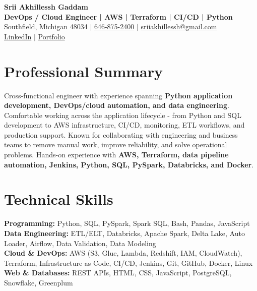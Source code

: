 \documentclass[letterpaper,10pt]{article}
\begin{document}
\fontsize{9.35pt}{10.45pt}\selectfont

\begin{center}
    {\LARGE \textbf{Srii Akhillessh Gaddam}} \\[-1pt]
    \textbf{DevOps / Cloud Engineer | AWS | Terraform | CI/CD | Python} \\[2pt]
    Southfield, Michigan 48034 $|$
    \href{tel:6468752400}{646-875-2400} $|$
    \href{mailto:sriiakhillessh@gmail.com}{sriiakhillessh@gmail.com} \\[1pt]
    \href{https://www.linkedin.com/in/srii-akhiilessh-gaddam-b48668191/}{LinkedIn} $|$
    \href{https://sriiakhillesshg.github.io/portfolio/}{Portfolio}
\end{center}
\vspace{-8pt}

\section{Professional Summary}
\small{Cross-functional engineer with experience spanning \textbf{Python application development, DevOps/cloud automation, and data engineering}. Comfortable working across the application lifecycle - from Python and SQL development to AWS infrastructure, CI/CD, monitoring, ETL workflows, and production support. Known for collaborating with engineering and business teams to remove manual work, improve reliability, and solve operational problems. Hands-on experience with \textbf{AWS, Terraform, data pipeline automation, Jenkins, Python, SQL, PySpark, Databricks, and Docker}.}

\section{Technical Skills}
\small{
\textbf{Programming:} Python, SQL, PySpark, Spark SQL, Bash, Pandas, JavaScript \\
\textbf{Data Engineering:} ETL/ELT, Databricks, Apache Spark, Delta Lake, Auto Loader, Airflow, Data Validation, Data Modeling \\
\textbf{Cloud \& DevOps:} AWS (S3, Glue, Lambda, Redshift, IAM, CloudWatch), Terraform, Infrastructure as Code, CI/CD, Jenkins, Git, GitHub, Docker, Linux \\
\textbf{Web \& Databases:} REST APIs, HTML, CSS, JavaScript, PostgreSQL, Snowflake, Greenplum
}
\end{document}
